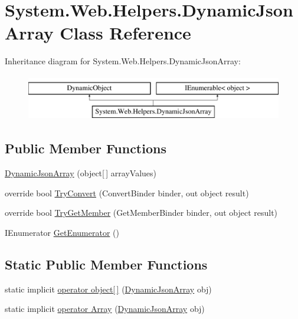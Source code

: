 \hypertarget{classSystem_1_1Web_1_1Helpers_1_1DynamicJsonArray}{}\section{System.\+Web.\+Helpers.\+Dynamic\+Json\+Array Class Reference}
\label{classSystem_1_1Web_1_1Helpers_1_1DynamicJsonArray}
Inheritance diagram for System.\+Web.\+Helpers.\+Dynamic\+Json\+Array\+:\begin{figure}[H]
\begin{center}
\leavevmode
\includegraphics[height=2.000000cm]{classSystem_1_1Web_1_1Helpers_1_1DynamicJsonArray}
\end{center}
\end{figure}
\subsection*{Public Member Functions}
\begin{DoxyCompactItemize}
\item 
\hyperlink{classSystem_1_1Web_1_1Helpers_1_1DynamicJsonArray_afbecf116a8981eaf517a54e71ee7cc48}{Dynamic\+Json\+Array} (object\mbox{[}$\,$\mbox{]} array\+Values)
\item 
override bool \hyperlink{classSystem_1_1Web_1_1Helpers_1_1DynamicJsonArray_a29e38e43a5955adc215833bb36650c37}{Try\+Convert} (Convert\+Binder binder, out object result)
\item 
override bool \hyperlink{classSystem_1_1Web_1_1Helpers_1_1DynamicJsonArray_a5a486af1f3055a91ace0c21476677527}{Try\+Get\+Member} (Get\+Member\+Binder binder, out object result)
\item 
I\+Enumerator \hyperlink{classSystem_1_1Web_1_1Helpers_1_1DynamicJsonArray_a312cd8a3b66ad5ce5ff640763826b057}{Get\+Enumerator} ()
\end{DoxyCompactItemize}
\subsection*{Static Public Member Functions}
\begin{DoxyCompactItemize}
\item 
static implicit \hyperlink{classSystem_1_1Web_1_1Helpers_1_1DynamicJsonArray_aa4bc62411aa6ec4bed9c8551a110d62a}{operator object\mbox{[}$\,$\mbox{]}} (\hyperlink{classSystem_1_1Web_1_1Helpers_1_1DynamicJsonArray}{Dynamic\+Json\+Array} obj)
\item 
static implicit \hyperlink{classSystem_1_1Web_1_1Helpers_1_1DynamicJsonArray_a4f1b74ac91d5f8f3a2b95475e05c4ad7}{operator Array} (\hyperlink{classSystem_1_1Web_1_1Helpers_1_1DynamicJsonArray}{Dynamic\+Json\+Array} obj)
\end{DoxyCompactItemize}
